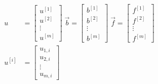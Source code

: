 \documentclass[]{article}
\begin{document}
        \begin{align*}\tag{1.1}\label{eqn:1.1}
            u &= \begin{bmatrix}
                u^{[1]} \\ u^{[2]} \\ \vdots \\ u^{[m]}
            \end{bmatrix}
            \;
            \vec{b} = \begin{bmatrix}
                b^{[1]} \\ b^{[2]} \\ \vdots \\ b^{[m]}
            \end{bmatrix}
            \;
            \vec{f} = \begin{bmatrix}
                f^{[1]} \\ f^{[2]}\\ \vdots \\ f^{[m]}
            \end{bmatrix}
            \\
            u^{[i]} &= 
            \begin{bmatrix}
                u_{1, i} \\ u_{2, i} \\ \vdots \\ u_{m, i}
            \end{bmatrix}
        \end{align*}
        
\end{document}
